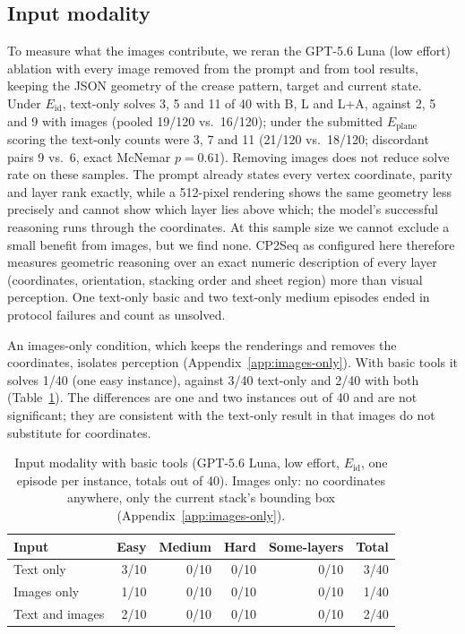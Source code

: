 \subsection{Input modality}
\label{sec:results-matched}
\label{sec:results-textonly}

To measure what the images contribute, we reran the GPT-5.6 Luna (low effort) ablation with
every image removed from the prompt and from tool results, keeping the JSON geometry of the crease
pattern, target and current state. Under $E_{\mathrm{id}}$, text-only solves 3, 5 and 11 of 40 with
B, L and L+A, against 2, 5 and 9 with images (pooled 19/120 vs.\ 16/120); under the submitted
$E_{\mathrm{plane}}$ scoring the text-only counts were 3, 7 and 11 (21/120 vs.\ 18/120; discordant
pairs 9 vs.\ 6, exact McNemar $p=0.61$). Removing images does not reduce solve rate on these
samples. The prompt already states every vertex coordinate, parity and layer rank exactly, while a
512-pixel rendering shows the same geometry less precisely and cannot show which layer lies above
which; the model's successful reasoning runs through the coordinates. At this sample size we
cannot exclude a small benefit from images, but we find none. CP2Seq as configured here therefore
measures geometric reasoning over an exact numeric description of every layer (coordinates,
orientation, stacking order and sheet region) more than visual perception. One
text-only basic and two text-only medium episodes ended in protocol failures and count as unsolved.

An images-only condition, which keeps the renderings and removes the coordinates, isolates
perception (Appendix~\ref{app:images-only}). With basic tools it solves 1/40 (one easy instance),
against 3/40 text-only and 2/40 with both (Table~\ref{tab:modality}). The differences are one and
two instances out of 40 and are not significant; they are consistent with the text-only result in
that images do not substitute for coordinates.

\begin{table}[htbp]
\centering
\caption{Input modality with basic tools (GPT-5.6 Luna, low effort, $E_{\mathrm{id}}$, one episode
per instance, totals out of 40). Images only: no coordinates anywhere, only the current stack's
bounding box (Appendix~\ref{app:images-only}).}
\label{tab:modality}
\small
\begin{tabular}{lrrrrr}
\hline
Input & Easy & Medium & Hard & Some-layers & Total \\
\hline
Text only & 3/10 & 0/10 & 0/10 & 0/10 & 3/40 \\
Images only & 1/10 & 0/10 & 0/10 & 0/10 & 1/40 \\
Text and images & 2/10 & 0/10 & 0/10 & 0/10 & 2/40 \\
\hline
\end{tabular}
\end{table}

